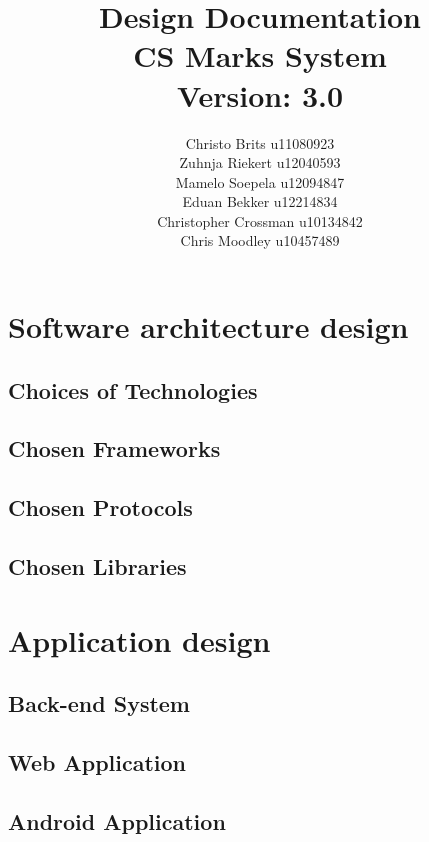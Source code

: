 \documentclass[12pt,a4paper]{article}
\begin{document}
\begin{titlepage}
\title{Design Documentation\\CS Marks System\\ \small Version: 3.0}
\author{Christo Brits u11080923\\
Zuhnja Riekert u12040593\\
Mamelo Soepela u12094847\\
Eduan Bekker u12214834\\
Christopher Crossman u10134842\\
Chris Moodley u10457489}
\maketitle
\end{titlepage}
\tableofcontents
\pagebreak
\section{Software architecture design}
\subsection{Choices of Technologies}
\subsection{Chosen Frameworks}
\subsection{Chosen Protocols}
\subsection{Chosen Libraries}
\pagebreak
\section{Application design}
\subsection{Back-end System}
\subsection{Web Application}
\subsection{Android Application}
\end{document}

